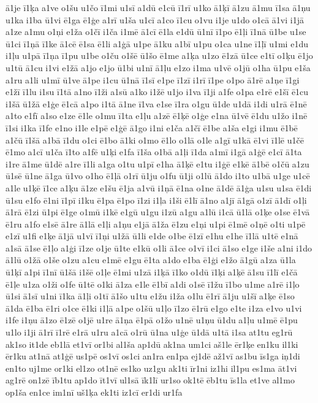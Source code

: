 {ā1je
ī1ķa
a1ve
o1šu
u1čo
ī1mi
u1sī
a1dū
e1cū
ī1rī
u1ko
ā1ķī
ā1zu
ā1mu
ī1sa
ā1ņu
u1ka
i1ba
ū1vi
ē1ga
ē1ģe
a1rī
u1ša
u1cī
a1co
ī1cu
o1vu
i1je
u1do
o1cā
ā1vi
i1jā
a1ze
a1mu
o1ņi
e1ža
o1čī
i1ča
i1mē
ā1cī
ē1la
e1dū
ū1nī
ī1po
ē1ļi
ī1nā
ū1be
u1se
ū1ci
ī1ņā
ī1ke
ā1cē
ē1sa
ē1li
a1ģā
u1pe
ā1ku
a1bī
u1pu
o1ca
u1ne
ī1ļī
u1mi
e1du
i1ļu
u1pā
ī1ņa
ī1pu
u1be
o1ču
o1šē
ū1šo
ē1me
a1ķa
u1zo
ē1zā
ū1ce
e1tī
o1ķu
ē1jo
u1tū
ā1cu
i1vi
e1žā
a1jo
e1jo
ū1bi
u1nī
ā1ļu
e1zo
i1ma
u1vē
o1jū
o1ha
ū1pu
e1ša
a1ru
a1li
u1mī
ū1ve
ā1pe
i1cu
ū1nā
ī1sī
e1pe
ī1zī
i1rī
ī1pe
o1po
ā1rē
a1ņe
ī1gi
e1žī
ī1lu
i1su
ī1tā
a1no
ī1ži
a1sū
a1ko
i1žē
u1jo
i1va
ī1ji
a1fe
o1pa
e1rē
e1šī
ē1cu
i1šā
ū1žā
e1ģe
ē1cā
a1po
i1tā
ā1ne
ī1va
e1se
ī1ra
o1gu
ū1de
u1dā
i1di
u1rā
ē1nē
a1to
e1fī
a1so
e1ze
ē1le
o1mu
ī1ta
e1ļu
a1zē
ē1ķē
o1ģe
e1na
ū1vē
ē1du
u1žo
i1nē
ī1si
i1ka
ī1fe
e1no
i1le
e1pē
e1ģē
ā1go
i1ni
e1ča
a1čī
ē1be
a1ša
e1gi
i1mu
ē1bē
a1čū
ī1šā
a1bā
ī1du
o1ci
ē1bo
ā1ki
o1mo
ē1lo
o1lā
o1le
a1gī
u1kā
ē1vi
ī1lē
u1čē
ē1mo
a1cī
u1ča
ī1to
a1fē
u1ķi
e1fa
ī1ša
o1bā
a1ļi
ī1da
a1mī
i1gā
a1ģē
e1cī
ā1ta
i1re
ā1me
ū1dē
a1re
ī1li
a1ga
o1tu
u1pī
e1ha
ā1ķē
e1tu
i1ģē
e1kē
ā1bē
o1čū
a1zu
ū1sē
ū1ne
ā1ga
ū1vo
o1ho
ē1ļā
o1rī
ū1ju
o1fu
ū1ji
o1lū
ā1do
i1to
u1bā
u1ge
u1cē
a1le
u1ķē
ī1ce
a1ķu
ā1ze
e1šu
ē1ja
a1vū
i1ņā
ē1na
o1ne
ā1dē
ā1ģa
u1su
u1sa
ē1di
ū1su
e1fo
ē1ni
ī1pī
i1ku
ē1pa
ē1po
ī1zi
i1ļa
i1ši
ē1lī
ā1no
a1jī
ā1gā
o1zī
ā1dī
o1ļi
ā1rā
ē1zi
ū1pi
ē1ge
o1mū
i1kē
e1gū
u1gu
i1zū
a1gu
a1lū
i1cā
ū1lā
o1ķe
o1se
ē1vā
ē1ru
a1fo
e1sē
ā1re
ā1lā
e1ļi
a1ņu
e1jā
ā1ža
ē1zu
e1ņi
u1pi
ē1mē
o1ņē
o1ti
u1pē
e1zī
u1fi
e1ķe
ā1jā
u1vī
ī1ņi
u1žā
ū1li
e1de
o1be
ē1zī
e1hu
e1he
ī1lā
u1tē
e1nā
a1sā
ā1se
ē1ļo
a1ģi
ī1ze
o1je
ū1te
e1kū
o1li
ā1ce
o1vī
i1ci
ā1so
e1ge
i1še
a1ni
i1do
ā1lū
o1žā
o1še
o1zu
a1cu
e1mē
e1gu
ē1ta
a1do
e1ba
ē1ģi
e1žo
ā1gū
a1za
ū1la
ū1ķī
a1pi
ī1nī
ū1šā
i1šē
o1ļe
ē1mi
u1zā
i1ķā
ī1ko
o1dū
ī1ķi
a1ķē
ā1su
ī1lī
e1čā
ē1ļe
u1za
o1ži
o1fe
ū1tē
o1ki
ā1za
e1le
ē1bī
a1di
o1sē
ī1žu
ī1bo
u1me
a1rē
i1ļo
ū1si
ā1sī
u1ni
ī1ka
ā1ļi
o1tī
ā1šo
u1tu
e1žu
i1ža
o1lu
ē1rī
ā1ju
u1šī
a1ķe
ē1so
ā1da
ē1ba
ē1ri
o1ce
ē1ki
i1ļā
a1pe
o1šū
u1ļo
ī1zo
ē1rū
e1go
e1te
i1za
e1vo
u1vi
i1fe
i1ņu
ā1zo
ē1zē
o1jē
u1re
ā1ņa
ē1pā
o1žo
u1nē
u1ņu
ū1du
a1ļu
u1mē
ē1pu
u1lo
i1ji
ā1rī
ī1rē
e1rā
u1ru
a1cā
o1rū
ū1na
u1ģe
ū1dā
u1tā
i1sa
at1tu
eg1rū
ak1so
it1de
eb1lā
et1vī
or1bi
al1ša
ap1dū
ak1na
um1ci
aš1le
ēr1ķe
en1ku
il1ki
ēr1ku
at1nā
at1ģē
us1pē
os1vī
os1ci
an1ra
en1pa
ej1dē
až1vī
as1bu
īs1ga
iņ1di
en1to
uj1me
or1ki
el1zo
ot1nē
es1ko
uz1gu
ak1ti
īr1ni
iz1hi
il1pu
es1ma
āt1vi
ag1rē
on1zē
īb1tu
ap1do
īt1vī
ul1sā
īk1lī
ur1so
ok1tē
ēb1tu
īs1la
et1ve
al1mo
op1ša
en1ce
im1nī
uš1ķa
ek1ti
iz1cī
er1di
ur1fa
}

